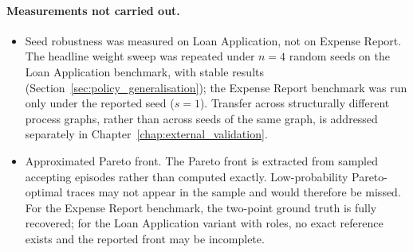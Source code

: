 \paragraph{Measurements not carried out.}
\begin{itemize}

    \item Seed robustness was measured on Loan Application, not on Expense Report.
    The headline weight sweep was repeated under $n=4$ random seeds on
    the Loan Application benchmark, with stable results
    (Section~\ref{sec:policy_generalisation}); the Expense Report
    benchmark was run only under the reported seed ($s=1$). Transfer
    across structurally different process graphs, rather than across
    seeds of the same graph, is addressed separately in
    Chapter~\ref{chap:external_validation}.

    \item Approximated Pareto front.
    The Pareto front is extracted from sampled accepting
    episodes rather than computed exactly.
    Low-probability Pareto-optimal traces may not appear
    in the sample and would therefore be missed.
    For the Expense Report benchmark, the two-point ground
    truth is fully recovered; for the Loan Application
    variant with roles, no exact reference exists and the
    reported front may be incomplete.

\end{itemize}

